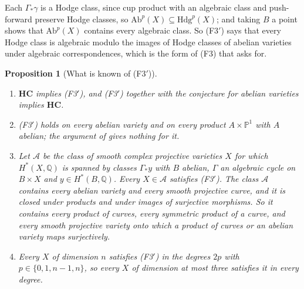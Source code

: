 \documentclass[11pt,reqno]{amsart}
\theoremstyle{plain}
\newtheorem{proposition}[theorem]{Proposition}
\theoremstyle{definition}
\theoremstyle{remark}
\newcommand{\QQ}{\mathbb{Q}}
\newcommand{\PP}{\mathbb{P}}
\newcommand{\Hdg}{\mathrm{Hdg}}
\begin{document}
Each $\Gamma_{*}\gamma$ is a Hodge class, since cup product with an
algebraic class and push-forward preserve Hodge classes, so
$\mathrm{Ab}^{p}(X)\subseteq\Hdg^{p}(X)$; and taking $B$ a point shows that
$\mathrm{Ab}^{p}(X)$ contains every algebraic class. So \textup{(F3$'$)} says
that every Hodge class is algebraic modulo the images of Hodge classes of
abelian varieties under algebraic correspondences, which is the form of (F3)
that  asks for.

\begin{proposition}[What is known of \textup{(F3$'$)}]\label{prop:f3prime}
\leavevmode
\begin{enumerate}[label=\textup{(\roman*)},leftmargin=2.6em]
\item $\mathbf{HC}$ implies \textup{(F3$'$)}, and \textup{(F3$'$)} together
  with the conjecture for abelian varieties implies $\mathbf{HC}$.
\item \textup{(F3$'$)} holds on every abelian variety and on every product
  $A\times\PP^{1}$ with $A$ abelian; the argument of  gives
  nothing for it.
\item Let $\mathcal{A}$ be the class of smooth complex projective varieties
  $X$ for which $H^{*}(X,\QQ)$ is spanned by classes $\Gamma_{*}y$ with $B$
  abelian, $\Gamma$ an algebraic cycle on $B\times X$ and
  $y\in H^{*}(B,\QQ)$. Every $X\in\mathcal{A}$ satisfies \textup{(F3$'$)}.
  The class $\mathcal{A}$ contains every abelian variety and every smooth
  projective curve, and it is closed under products and under images of
  surjective morphisms. So it contains every product of curves, every
  symmetric product of a curve, and every smooth projective variety onto
  which a product of curves or an abelian variety maps surjectively.
\item Every $X$ of dimension $n$ satisfies \textup{(F3$'$)} in the degrees
  $2p$ with $p\in\{0,1,n-1,n\}$, so every $X$ of dimension at most three
  satisfies it in every degree.
\end{enumerate}
\end{proposition}
\end{document}
